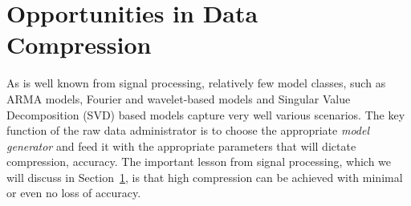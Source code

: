 
\section{Opportunities in Data Compression}
\label{sec:compression}
As is well known from signal processing, relatively few model classes, such as ARMA models, Fourier and wavelet-based models and Singular Value Decomposition (SVD) based models capture very well various scenarios. The key function of the raw data administrator is to choose the appropriate {\em model generator} and feed it with the appropriate parameters that will dictate compression, accuracy. The important lesson from signal processing, which we will discuss in Section~\ref{sec:compression}, is that high compression can be achieved with minimal or even no loss of accuracy.
